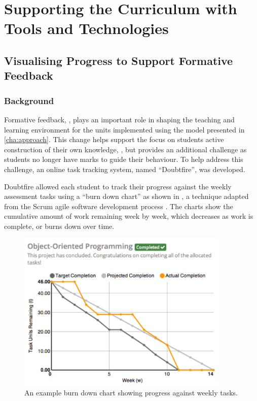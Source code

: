 
\chapter{Supporting the Curriculum with Tools and Technologies} %
\label{cha:supporting}

\graphicspath{{Figures/Supporting/}}

\section{Visualising Progress to Support Formative Feedback} %
\label{sec:doubtfire}

\subsection{Background} %
\label{sub:doubtfire_background}

Formative feedback, , plays an important role in shaping the teaching and learning environment for the units implemented using the model presented in \cref{cha:approach}. This change helps support the focus on students active construction of their own knowledge, , but provides an additional challenge as students no longer have marks to guide their behaviour. To help address this challenge, an online task tracking system, named ``Doubtfire'', was developed. 

Doubtfire allowed each student to track their progress against the weekly assessment tasks using a ``burn down chart'' as shown in , a technique adapted from the Scrum agile software development process \cite{Schwaber:2002}. The charts show the cumulative amount of work remaining week by week, which decreases as work is complete, or burns down over time.

\begin{figure}[thb]
  \centering
  \includegraphics[width=0.9\textwidth]{ExampleChart}
  \caption{An example burn down chart showing progress against weekly tasks.}
  \label{fig:example_chart}
\end{figure}


